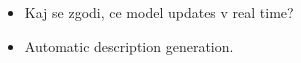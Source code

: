 \begin{itemize}
	\item Kaj se zgodi, ce model updates v real time?
	\item Automatic description generation.
\end{itemize}